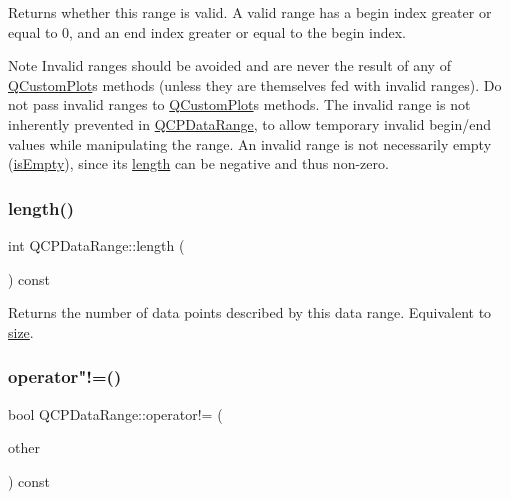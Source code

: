 Returns whether this range is valid. A valid range has a begin index greater or equal to 0, and an end index greater or equal to the begin index.

\begin{DoxyNote}{Note}
Invalid ranges should be avoided and are never the result of any of \mbox{\hyperlink{class_q_custom_plot}{Q\+Custom\+Plot}}\textquotesingle{}s methods (unless they are themselves fed with invalid ranges). Do not pass invalid ranges to \mbox{\hyperlink{class_q_custom_plot}{Q\+Custom\+Plot}}\textquotesingle{}s methods. The invalid range is not inherently prevented in \mbox{\hyperlink{class_q_c_p_data_range}{Q\+C\+P\+Data\+Range}}, to allow temporary invalid begin/end values while manipulating the range. An invalid range is not necessarily empty (\mbox{\hyperlink{class_q_c_p_data_range_ac32e53fc05d6cd2eac96b96a7265d3b8}{is\+Empty}}), since its \mbox{\hyperlink{class_q_c_p_data_range_a1e7836058f755c6ab9f11996477b7150}{length}} can be negative and thus non-\/zero. 
\end{DoxyNote}
\mbox{\label{class_q_c_p_data_range_a1e7836058f755c6ab9f11996477b7150}} 
\subsubsection{\texorpdfstring{length()}{length()}}
{\footnotesize\ttfamily int Q\+C\+P\+Data\+Range\+::length (\begin{DoxyParamCaption}{ }\end{DoxyParamCaption}) const\hspace{0.3cm}{\ttfamily [inline]}}

Returns the number of data points described by this data range. Equivalent to \mbox{\hyperlink{class_q_c_p_data_range_ac6af055e509d1b691c244954ff1c5887}{size}}. \mbox{\label{class_q_c_p_data_range_a5bcc9597731a7455407853ed0585f6ab}} 
\subsubsection{\texorpdfstring{operator"!=()}{operator!=()}}
{\footnotesize\ttfamily bool Q\+C\+P\+Data\+Range\+::operator!= (\begin{DoxyParamCaption}\item[{const \mbox{\hyperlink{class_q_c_p_data_range}{Q\+C\+P\+Data\+Range}} \&}]{other }\end{DoxyParamCaption}) const\hspace{0.3cm}{\ttfamily [inline]}}

